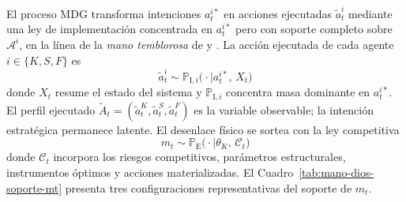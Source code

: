 \documentclass[12pt]{article}
\providecommand{\textcite}{\citet}
\theoremstyle{definition}
\theoremstyle{remark}
\newcommand{\ProbE}{\mathbb{P}_{\mathrm{E}}}
\newcommand{\ProbI}[1]{\mathbb{P}_{\mathrm{I},#1}}
\newcommand{\1}{\mathbf{1}}
\begin{document}
El proceso MDG transforma intenciones $a_t^{i\ast}$ en acciones ejecutadas $\tilde{a}_t^i$ mediante una ley de implementación concentrada en $a_t^{i\ast}$ pero con soporte completo sobre $\mathcal{A}^i$, en la línea de la \textit{mano temblorosa} de \textcite{Selten1975Perfectness} y \textcite{KrepsWilson1982}. La acción ejecutada de cada agente $i\in\{K,S,F\}$ es
\begin{equation}
\label{eq:mano-dios-jugador}
\tilde{a}_t^i \sim \ProbI{i}\bigl(\cdot \mid a_t^{i\ast},\, X_t\bigr)
\end{equation}
donde $X_t$ resume el estado del sistema y $\ProbI{i}$ concentra masa dominante en $a_t^{i\ast}$. El perfil ejecutado $\tilde{A}_t=(\tilde{a}_t^K,\tilde{a}_t^S,\tilde{a}_t^F)$ es la variable observable; la intención estratégica permanece latente. El desenlace físico se sortea con la ley competitiva
\begin{equation}
\label{eq:m-given-tilde-A}
m_t \sim \ProbE\bigl(\cdot \mid \theta_K,\,\mathcal C_t\bigr)
\end{equation}
donde $\mathcal C_t$ incorpora los riesgos competitivos, parámetros estructurales, instrumentos óptimos y acciones materializadas. El Cuadro~\ref{tab:mano-dios-soporte-mt} presenta tres configuraciones representativas del soporte de $m_t$.

\medskip
\end{document}
